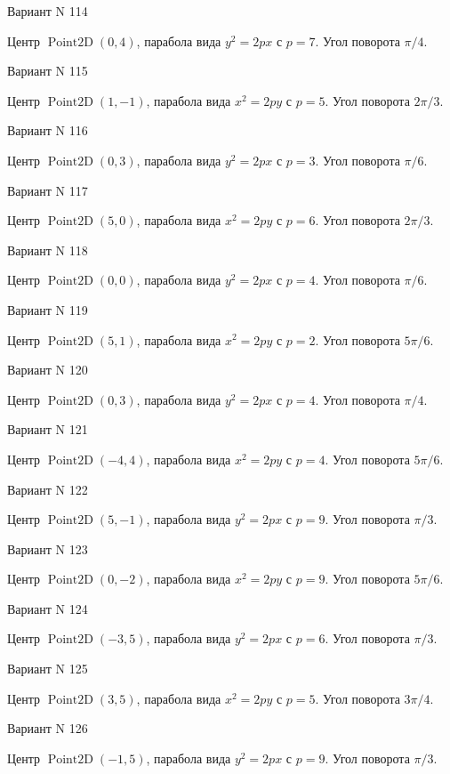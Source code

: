 \documentclass[11pt]{report}
\begin{document}
Вариант N 114

Центр $\operatorname{Point2D}\left(0, 4\right)$, парабола вида $y^{2} = 2px$ с $p = 7$. Угол поворота $\pi / 4$.

Вариант N 115

Центр $\operatorname{Point2D}\left(1, -1\right)$, парабола вида $x^{2} = 2py$ с $p = 5$. Угол поворота $2 \pi / 3$.

Вариант N 116

Центр $\operatorname{Point2D}\left(0, 3\right)$, парабола вида $y^{2} = 2px$ с $p = 3$. Угол поворота $\pi / 6$.

Вариант N 117

Центр $\operatorname{Point2D}\left(5, 0\right)$, парабола вида $x^{2} = 2py$ с $p = 6$. Угол поворота $2 \pi / 3$.

Вариант N 118

Центр $\operatorname{Point2D}\left(0, 0\right)$, парабола вида $y^{2} = 2px$ с $p = 4$. Угол поворота $\pi / 6$.

Вариант N 119

Центр $\operatorname{Point2D}\left(5, 1\right)$, парабола вида $x^{2} = 2py$ с $p = 2$. Угол поворота $5 \pi / 6$.

Вариант N 120

Центр $\operatorname{Point2D}\left(0, 3\right)$, парабола вида $y^{2} = 2px$ с $p = 4$. Угол поворота $\pi / 4$.

Вариант N 121

Центр $\operatorname{Point2D}\left(-4, 4\right)$, парабола вида $x^{2} = 2py$ с $p = 4$. Угол поворота $5 \pi / 6$.

Вариант N 122

Центр $\operatorname{Point2D}\left(5, -1\right)$, парабола вида $y^{2} = 2px$ с $p = 9$. Угол поворота $\pi / 3$.

Вариант N 123

Центр $\operatorname{Point2D}\left(0, -2\right)$, парабола вида $x^{2} = 2py$ с $p = 9$. Угол поворота $5 \pi / 6$.

Вариант N 124

Центр $\operatorname{Point2D}\left(-3, 5\right)$, парабола вида $y^{2} = 2px$ с $p = 6$. Угол поворота $\pi / 3$.

Вариант N 125

Центр $\operatorname{Point2D}\left(3, 5\right)$, парабола вида $x^{2} = 2py$ с $p = 5$. Угол поворота $3 \pi / 4$.

Вариант N 126

Центр $\operatorname{Point2D}\left(-1, 5\right)$, парабола вида $y^{2} = 2px$ с $p = 9$. Угол поворота $\pi / 3$.
\end{document}
